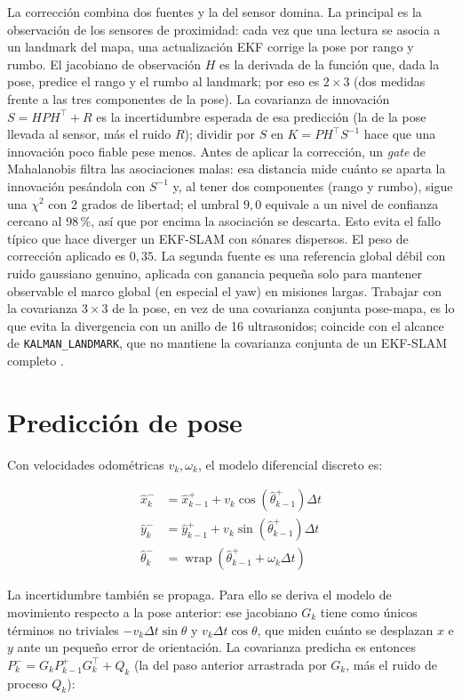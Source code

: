 La corrección combina dos fuentes y la del sensor domina. La principal es la
observación de los sensores de proximidad: cada vez que una lectura se asocia a
un landmark del mapa, una actualización EKF corrige la pose por rango y rumbo.
El jacobiano de observación \(H\) es la derivada de la función que, dada la pose,
predice el rango y el rumbo al landmark; por eso es \(2\times3\) (dos medidas
frente a las tres componentes de la pose). La covarianza de innovación
\(S=HPH^\top+R\) es la incertidumbre esperada de esa predicción (la de la pose
llevada al sensor, más el ruido \(R\)); dividir por \(S\) en \(K=PH^\top S^{-1}\)
hace que una innovación poco fiable pese menos. Antes de aplicar la corrección,
un \emph{gate} de Mahalanobis filtra las asociaciones malas: esa distancia mide
cuánto se aparta la innovación pesándola con \(S^{-1}\) y, al tener dos
componentes (rango y rumbo), sigue una \(\chi^2\) con 2 grados de libertad; el
umbral \(9{,}0\) equivale a un nivel de confianza cercano al 98\,\%, así que por
encima la asociación se descarta. Esto evita el fallo típico que hace diverger un
EKF-SLAM con sónares dispersos. El peso de corrección aplicado es \(0{,}35\). La segunda fuente es una referencia global débil con ruido gaussiano
genuino, aplicada con ganancia pequeña solo para mantener observable el marco
global (en especial el yaw) en misiones largas. Trabajar con la covarianza
\(3\times3\) de la pose, en vez de una covarianza conjunta pose-mapa, es lo que
evita la divergencia con un anillo de 16 ultrasonidos; coincide con el alcance de
\texttt{KALMAN\_LANDMARK}, que no mantiene la covarianza conjunta de un EKF-SLAM
completo \cite{thrun2005}.

\section{Predicción de pose}

Con velocidades odométricas \(v_k,\omega_k\), el modelo diferencial discreto es:

\[
\begin{aligned}
\hat{x}_{k}^{-} &= \hat{x}_{k-1}^{+} + v_k\cos(\hat{\theta}_{k-1}^{+})\Delta t\\
\hat{y}_{k}^{-} &= \hat{y}_{k-1}^{+} + v_k\sin(\hat{\theta}_{k-1}^{+})\Delta t\\
\hat{\theta}_{k}^{-} &= \operatorname{wrap}(\hat{\theta}_{k-1}^{+}+\omega_k\Delta t)
\end{aligned}
\]

La incertidumbre también se propaga. Para ello se deriva el modelo de movimiento
respecto a la pose anterior: ese jacobiano \(G_k\) tiene como únicos términos no
triviales \(-v_k\Delta t\sin\theta\) y \(v_k\Delta t\cos\theta\), que miden cuánto
se desplazan \(x\) e \(y\) ante un pequeño error de orientación. La covarianza
predicha es entonces \(P_k^-=G_k P_{k-1}^+ G_k^\top+Q_k\) (la del paso anterior
arrastrada por \(G_k\), más el ruido de proceso \(Q_k\)):

